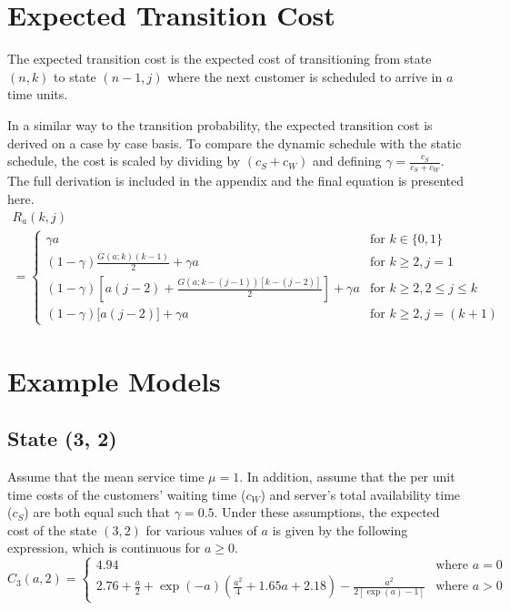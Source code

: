 \section{Expected Transition Cost}
The expected transition cost is the expected cost of transitioning from state $(n, k)$ to state $(n - 1, j)$ where the next customer is scheduled to arrive in $a$ time units.

In a similar way to the transition probability, the expected transition cost is derived on a case by case basis. To compare the dynamic schedule with the static schedule, the cost is scaled by dividing by $(c_{S} + c_{W})$ and defining $\gamma = \frac{c_{S}}{c_{S} + c_{W}}$. The full derivation is included in the appendix and the final equation is presented here.
\begin{multline}
	R_{a} (k, j) \\
	= \begin{cases}
		\gamma a & \text{for $k \in \{ 0, 1 \}$} \\
		(1 - \gamma) \frac{G (a; k) (k - 1)}{2} + \gamma a & \text{for $k \geq 2, j = 1$} \\
		(1 - \gamma) \left[ a (j - 2) + \frac{G (a; k - (j - 1)) [k - (j - 2)]}{2} \right] + \gamma a & \text{for $k \geq 2, 2 \leq j \leq k$} \\
		(1 - \gamma) \big[ a (j - 2) \big] + \gamma a & \text{for $k \geq 2, j = (k + 1)$}
	\end{cases}
\end{multline}

\section{Example Models}
\subsection{State (3, 2)}
Assume that the mean service time $\mu = 1$. In addition, assume that the per unit time costs of the customers' waiting time ($c_{W}$) and server's total availability time ($c_{S}$) are both equal such that $\gamma = 0.5$. Under these assumptions, the expected cost of the state $(3, 2)$ for various values of $a$ is given by the following expression, which is continuous for $a \geq 0$.
\begin{equation*}
	C_{3} (a, 2) =
	\begin{cases}
 		4.94 & \text{where $a = 0$} \\
 		2.76 + \frac{a}{2} + \exp (- a) \left( \frac{a^{2}}{4} + 1.65 a + 2.18 \right) - \frac{a^{2}}{2 [\exp (a) - 1]} & \text{where $a > 0$}
	\end{cases}
\end{equation*}

